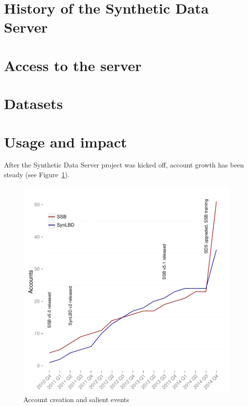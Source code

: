 \documentclass[12pt,titlepage]{article}
\date{\myversion
}
\title{\mytitle}
\author{\myauthorA \and \myauthorB}
\begin{document}

\maketitle

 

 



\section{History of the Synthetic Data Server}



\section{Access to the server}


%

\section{Datasets}


\section{Usage and impact}
After the Synthetic Data Server project was kicked off, account growth has been steady (see Figure~\ref{fig:accounts}).

\begin{figure}
\centering
\caption{Account creation and salient events\label{fig:accounts}}
\includegraphics{report_on_SDS_2015-accounts}
\end{figure}
\end{document}
